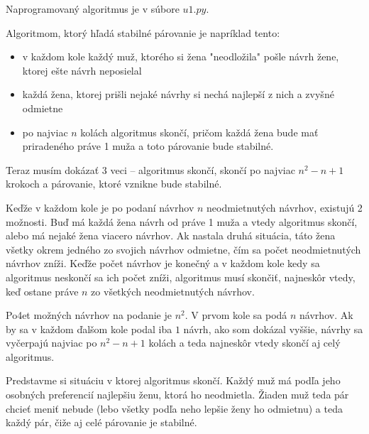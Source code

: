 
Naprogramovaný algoritmus je v súbore $u1.py$.

Algoritmom, ktorý hľadá stabilné párovanie je napríklad tento:
\begin{itemize}
    \item v každom kole každý muž, ktorého si žena "neodložila" pošle 
    návrh žene, ktorej ešte návrh neposielal
    \item každá žena, ktorej prišli nejaké návrhy si nechá najlepší 
    z nich a zvyšné odmietne
    \item po najviac $n$ kolách algoritmus skončí, pričom každá žena 
    bude mať priradeného práve 1 muža a toto párovanie bude stabilné.
\end{itemize}

Teraz musím dokázať 3 veci -- algoritmus skončí, skončí po najviac 
$n^2-n+1$ krokoch a párovanie, ktoré vznikne bude stabilné. 

Keďže v každom kole je po podaní návrhov $n$ neodmietnutých návrhov, 
existujú 2 možnosti. Buď má každá žena návrh od práve 1 muža a vtedy 
algoritmus skončí, alebo má nejaké žena viacero návrhov. Ak nastala 
druhá situácia, táto žena všetky okrem jedného zo svojich návrhov 
odmietne, čím sa počet neodmietnutých návrhov zníži. Keďže počet 
návrhov je konečný a v každom kole kedy sa algoritmus neskončí 
sa ich počet zníži, algoritmus musí skončiť, najneskôr vtedy, keď 
ostane práve $n$ zo všetkých neodmietnutých návrhov.

Po4et možných návrhov na podanie je $n^2$. V prvom kole sa podá $n$ 
návrhov. Ak by sa v každom ďalšom kole podal iba $1$ návrh, ako 
som dokázal vyššie, návrhy sa vyčerpajú najviac po $n^2-n+1$ kolách 
a teda najneskôr vtedy skončí aj celý algoritmus.

Predstavme si situáciu v ktorej algoritmus skončí. Každý muž má podľa 
jeho osobných preferencií najlepšiu ženu, ktorá ho neodmietla. 
Žiaden muž teda pár chcieť meniť nebude (lebo všetky podľa neho lepšie 
ženy ho odmietnu) a teda každý pár, čiže aj celé párovanie je stabilné. 

